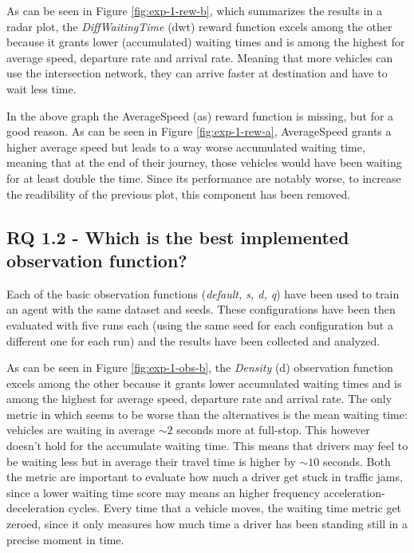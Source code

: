 As can be seen in Figure \ref{fig:exp-1-rew-b}, which summarizes the results in a radar plot, the \textit{DiffWaitingTime} (dwt) reward function excels among the other because it grants lower (accumulated) waiting times and is among the highest for average speed, departure rate and arrival rate.
Meaning that more vehicles can use the intersection network, they can arrive faster at destination and have to wait less time.


In the above graph the AverageSpeed (as) reward function is missing, but for a good reason.
As can be seen in Figure \ref{fig:exp-1-rew-a}, AverageSpeed grants a higher average speed but leads to a way worse accumulated waiting time, meaning that at the end of their journey, those vehicles would have been waiting for at least double the time.
Since its performance are notably worse, to increase the readibility of the previous plot, this component has been removed.


\subsection{RQ 1.2 - Which is the best implemented observation function?}

Each of the basic observation functions (\textit{default, s, d, q}) have been used to train an agent with the same dataset and seeds. These configurations have been then evaluated with five runs each (using the same seed for each configuration but a different one for each run) and the results have been collected and analyzed.

As can be seen in Figure \ref{fig:exp-1-obs-b}, the \textit{Density} (d) observation function excels among the other because it grants lower accumulated waiting times and is among the highest for average speed, departure rate and arrival rate.
The only metric in which seems to be worse than the alternatives is the mean waiting time: vehicles are waiting in average $\sim2$ seconds more at full-stop.
This however doesn't hold for the accumulate waiting time.
This means that drivers may feel to be waiting less but in average their travel time is higher by $\sim10$ seconds.
Both the metric are important to evaluate how much a driver get stuck in traffic jams, since a lower waiting time score may means an higher frequency acceleration-deceleration cycles.
Every time that a vehicle moves, the waiting time metric get zeroed, since it only measures how much time a driver has been standing still in a precise moment in time.

